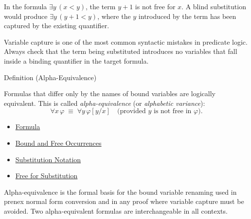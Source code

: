 \begin{example*}
In the formula $\exists y\,(x<y)$, the term $y+1$ is not free for $x$. A blind
substitution would produce $\exists y\,(y+1<y)$, where the $y$ introduced by
the term has been captured by the existing quantifier.
\end{example*}

\begin{remark*}
Variable capture is one of the most common syntactic mistakes in predicate
logic. Always check that the term being substituted introduces no variables that
fall inside a binding quantifier in the target formula.
\end{remark*}

\begin{definitionbox}{Definition (Alpha-Equivalence)}
\begin{definition}\label{def:alpha-equiv}
Formulas that differ only by the names of bound variables are logically
equivalent. This is called \emph{alpha-equivalence} (or \emph{alphabetic
variance}):
\[
\forall x\,\varphi \;\equiv\; \forall y\,\varphi[y/x]
\quad\text{(provided $y$ is not free in $\varphi$).}
\]
\end{definition}
\end{definitionbox}

\begin{dependencies}
\begin{itemize}
  \item \hyperref[def:formula]{Formula}
  \item \hyperref[def:bound-free]{Bound and Free Occurrences}
  \item \hyperref[def:subst-notation]{Substitution Notation}
  \item \hyperref[def:free-for]{Free for Substitution}
\end{itemize}
\end{dependencies}

\begin{remark*}[Consequence]
Alpha-equivalence is the formal basis for the bound variable renaming used
in prenex normal form conversion and in any proof where variable capture must
be avoided. Two alpha-equivalent formulas are interchangeable in all contexts.
\end{remark*}
